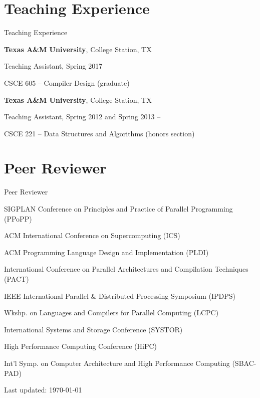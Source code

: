 \documentclass[a4paper,10pt,oneside]{article}
\begin{document}
\begin{body}

\section{Teaching Experience}
{Teaching Experience}

{\textbf{Texas A\&M University}},
College Station, TX
\par
Teaching Assistant, Spring 2017
\hfill
{}
\begin{detail}
CSCE 605 -- Compiler Design (graduate)
\end{detail}

\EntryGap


{\textbf{Texas A\&M University}},
College Station, TX
\par
Teaching Assistant, Spring 2012 and Spring 2013
\hfill
{} --
\begin{detail}
CSCE 221 -- Data Structures and Algorithms (honors section)
\end{detail}






\section{Peer Reviewer}
{Peer Reviewer}

SIGPLAN Conference on Principles and Practice of Parallel Programming (PPoPP)
\par ACM International Conference on Supercomputing (ICS)
\par ACM Programming Language Design and Implementation (PLDI)
\par International Conference on Parallel Architectures and Compilation Techniques (PACT)
\par IEEE International Parallel \& Distributed Processing Symposium (IPDPS)
\par Wkshp. on Languages and Compilers for Parallel Computing (LCPC)
\par International Systems and Storage Conference (SYSTOR)
\par High Performance Computing Conference (HiPC)
\par Int'l Symp. on Computer Architecture and High Performance Computing (SBAC-PAD)






\EntryGap
\EntryGap
\EntryGap

  \begin{small}
    Last updated: \today
  \end{small}


\end{body}
\end{document}
